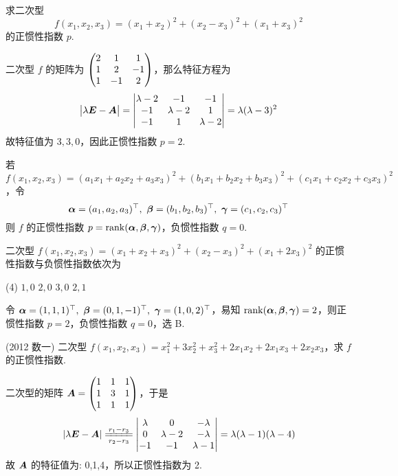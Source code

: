 \begin{example}
    \label{fx1x2x3p}求二次型 $$f(x_1,x_2,x_3)=(x_1+x_2)^2+(x_2-x_3)^2+(x_1+x_3)^2$$ 的正惯性指数 $p.$
\end{example}
\begin{solution}
    二次型 $f$ 的矩阵为 $\mqty(2&1&1\\1&2&-1\\1&-1&2)$，那么特征方程为 $$\mqty|\lambda\vb*{E}-\vb*{A}|=\mqty|\lambda-2&-1&-1\\-1&\lambda-2&1\\-1&1&\lambda-2|=\lambda(\lambda-3)^2$$
    故特征值为 $3,3,0$，因此正惯性指数 $p=2.$
\end{solution}

\begin{theorem}
    若 $f(x_1,x_2,x_3)=(a_1x_1+a_2x_2+a_3x_3)^2+(b_1x_1+b_2x_2+b_3x_3)^2+(c_1x_1+c_2x_2+c_3x_3)^2$，令
    $$\vb*{\alpha}=(a_1,a_2,a_3)^\top,~\vb*{\beta}=(b_1,b_2,b_3)^\top,~\vb*{\gamma}=(c_1,c_2,c_3)^\top$$
    则 $f$ 的正惯性指数 $p=\rank(\vb*{\alpha},\vb*{\beta},\vb*{\gamma})$，负惯性指数 $q=0.$
\end{theorem}

\begin{example}
    二次型 $f(x_1,x_2,x_3)=(x_1+x_2+x_3)^2+(x_2-x_3)^2+(x_1+2x_3)^2$ 的正惯性指数与负惯性指数依次为
    \begin{tasks}(4)
        \task $1,0$
        \task $2,0$
        \task $3,0$
        \task $2,1$
    \end{tasks}
\end{example}
\begin{solution}
    令 $\vb*{\alpha}=(1,1,1)^\top,~\vb*{\beta}=(0,1,-1)^\top,~\vb*{\gamma}=(1,0,2)^\top$，易知 $\rank(\vb*{\alpha},\vb*{\beta},\vb*{\gamma})=2$，则正惯性指数 $p=2$，负惯性指数 $q=0$，选 B.
\end{solution}

\begin{example}
    (2012 数一) 二次型 $f(x_1,x_2,x_3)=x_1^2+3x_2^2+x_3^2+2x_1x_2+2x_1x_3+2x_2x_3$，求 $f$ 的正惯性指数.
\end{example}
\begin{solution}
    二次型的矩阵 $\vb*{A}=\mqty(1&1&1\\1&3&1\\1&1&1)$，于是
    $$|\lambda\vb*{E}-\vb*{A}|\xlongequal[r_2-r_3]{r_1-r_3}\mqty|\lambda&0&-\lambda\\0&\lambda-2&-\lambda\\-1&-1&\lambda-1|=\lambda(\lambda-1)(\lambda-4)$$
    故 $\vb*{A}$ 的特征值为: 0,1,4，所以正惯性指数为 2.
\end{solution}


